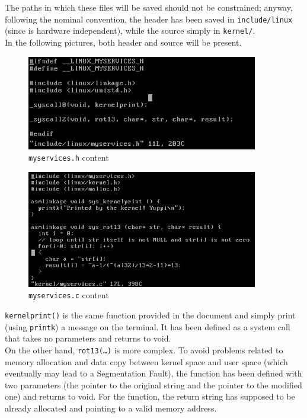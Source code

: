 \documentclass{article}
\begin{document}
The paths in which these files will be saved should not be constrained; anyway, following the nominal convention, the header
has been saved in \texttt{include/linux} (since is hardware independent), while the source simply in \texttt{kernel/}.\\

In the following pictures, both header and source will be present.

\begin{figure}[h!]
  \centering
  \includegraphics[width=0.9\textwidth]{./services_h.png}
  \caption{\texttt{myservices.h} content}
\end{figure}


\begin{figure}[h!]
  \centering
  \includegraphics[width=0.9\textwidth]{./services_c.png}
  \caption{\texttt{myservices.c} content}
\end{figure}

\texttt{kernelprint()} is the same function provided in the document and simply print (using \texttt{printk}) a message on the terminal. 
It has been defined as a system call that takes no parameters and returns to void. \\

On the other hand, \texttt{rot13(\dots)} is more complex.
To avoid problems related to memory allocation and data copy between kernel space and user space (which eventually may lead to a Segmentation Fault),
the function has been defined with two parameters (the pointer to the original string and the pointer to the modified one) and returns to void.
For the function, the return string has supposed to be already allocated and pointing to a valid memory address.
\\
\end{document}
